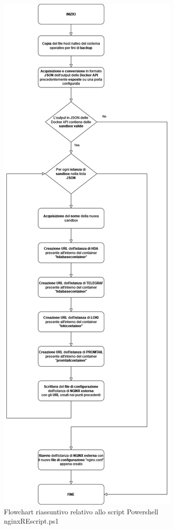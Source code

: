 \begin{figure}[!h]     
\centering 
    \includegraphics[width=0.5\columnwidth]{immagini/flowchart/flowchart_nginxREscript} 
    \caption{Flowchart riassuntivo relativo allo script Powershell nginxREscript.ps1}
\end{figure}\\









